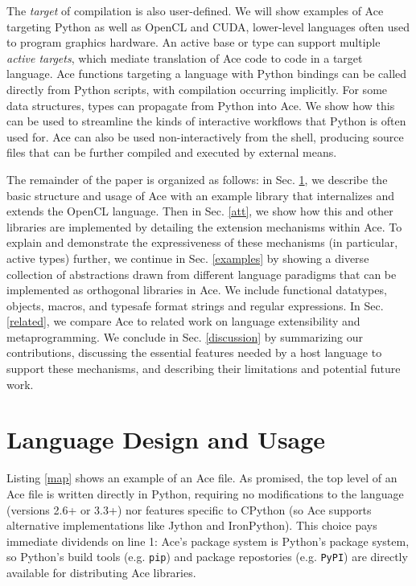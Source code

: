 \documentclass[9pt,preprint]{sigplanconf}
\begin{document}
The \emph{target} of compilation is also user-defined. We will show examples of Ace targeting Python as well as OpenCL and CUDA, lower-level languages often used to program graphics hardware. An active base or type can support multiple \emph{active targets}, which mediate translation of Ace code to code in a target language. Ace functions targeting a language with Python bindings can be called directly from Python scripts, with compilation occurring implicitly. For some data structures, types can propagate from Python into Ace. We show how this can be used to streamline the kinds of interactive workflows that Python is often used for. Ace can also be used non-interactively from the shell, producing source files that can be further compiled and executed by external means.

The remainder of the paper is organized as follows: in Sec. \ref{usage}, we describe the basic structure and usage of Ace with an example library that internalizes and extends the OpenCL language. Then in Sec. \ref{att}, we show how this and other libraries are implemented by detailing the extension mechanisms within Ace. To explain and demonstrate the expressiveness of these mechanisms (in particular, active types) further, we continue in Sec.  \ref{examples} by showing a diverse collection of abstractions drawn from different language paradigms that can be implemented as orthogonal libraries in Ace. We include functional datatypes, objects, macros, and typesafe format strings and regular expressions. In Sec.  \ref{related}, we compare Ace to related work on language extensibility and metaprogramming. We conclude in Sec. \ref{discussion} by summarizing our contributions, discussing the essential features needed by a host language to support these mechanisms, and describing their limitations and potential future work. 

\section{Language Design and Usage}\label{usage}
Listing \ref{map} shows an example of an Ace file. As promised, the top level of an Ace file is written directly in Python, requiring no modifications to the language (versions 2.6+ or 3.3+) nor features specific to CPython (so Ace supports alternative implementations like Jython and IronPython). This choice pays immediate dividends on line 1: Ace's package system is Python's package system, so Python's build tools (e.g. \verb|pip|) and package repostories (e.g. \verb|PyPI|) are directly available for distributing Ace libraries. 
\end{document}
